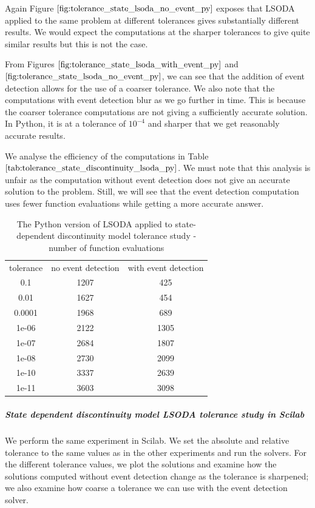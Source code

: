 Again Figure $\ref{fig:tolerance_state_lsoda_no_event_py}$ exposes that LSODA applied to the same problem at different tolerances gives substantially different results. We would expect the computations at the sharper tolerances to give quite similar results but this is not the case.

From Figures $\ref{fig:tolerance_state_lsoda_with_event_py}$ and $\ref{fig:tolerance_state_lsoda_no_event_py}$, we can see that the addition of event detection allows for the use of a coarser tolerance. We also note that the computations with event detection blur as we go further in time. This is because the coarser tolerance computations are not giving a sufficiently accurate solution. In Python, it is at a tolerance of $10^{-4}$ and sharper that we get reasonably accurate results. 

We analyse the efficiency of the computations in Table $\ref{tab:tolerance_state_discontinuity_lsoda_py}$. We must note that this analysis is unfair as the computation without event detection does not give an accurate solution to the problem. Still, we will see that the event detection computation uses fewer function evaluations while getting a more accurate answer.

\begin{table}[h]
\caption {The Python version of LSODA applied to state-dependent discontinuity model tolerance study - number of function evaluations} \label{tab:tolerance_state_discontinuity_lsoda_py} 
\begin{center}
\begin{tabular}{ c c c }
tolerance & no event detection & with event detection \\
0.1 & 1207 & 425 \\
0.01 & 1627 & 454 \\
0.0001 & 1968 & 689 \\
1e-06 & 2122 & 1305 \\
1e-07 & 2684 & 1807 \\
1e-08 & 2730 & 2099 \\
1e-10 & 3337 & 2639 \\
1e-11 & 3603 & 3098 \\
\end{tabular}
\end{center}
\end{table}

\subparagraph{State dependent discontinuity model LSODA tolerance study in Scilab}

We perform the same experiment in Scilab. We set the absolute and relative tolerance to the same values as in the other experiments and run the solvers. For the different tolerance values, we plot the solutions and examine how the solutions computed without event detection change as the tolerance is sharpened; we also examine how coarse a tolerance we can use with the event detection solver.


